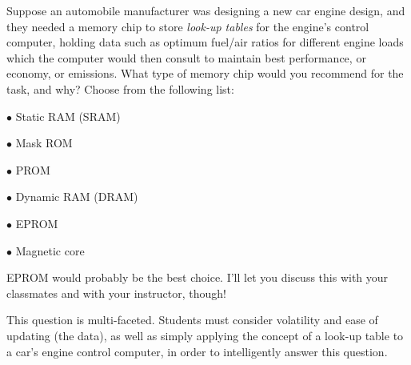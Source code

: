 

Suppose an automobile manufacturer was designing a new car engine design, and they needed a memory chip to store {\it look-up tables} for the engine's control computer, holding data such as optimum fuel/air ratios for different engine loads which the computer would then consult to maintain best performance, or economy, or emissions.  What type of memory chip would you recommend for the task, and why?  Choose from the following list:

\medskip
\item{$\bullet$} Static RAM (SRAM)
\item{$\bullet$} Mask ROM
\item{$\bullet$} PROM
\item{$\bullet$} Dynamic RAM (DRAM)
\item{$\bullet$} EPROM
\item{$\bullet$} Magnetic core
\medskip







EPROM would probably be the best choice.  I'll let you discuss this with your classmates and with your instructor, though!







This question is multi-faceted.  Students must consider volatility and ease of updating (the data), as well as simply applying the concept of a look-up table to a car's engine control computer, in order to intelligently answer this question.




